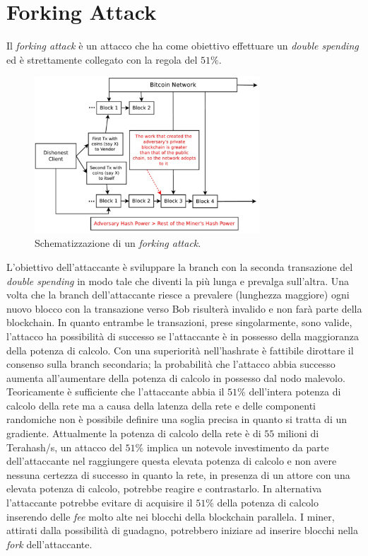 \section{Forking Attack}
Il \textit{forking attack} è un attacco che ha come obiettivo effettuare un \textit{double spending} ed è strettamente collegato con la regola del $51\%$.
\begin{figure}[H]
    \centering
    \includegraphics[width=0.75\textwidth]{images/forkingattack.png}
    \caption{Schematizzazione di un \textit{forking attack}.}
\end{figure}
L'obiettivo dell'attaccante è sviluppare la branch con la seconda transazione del \textit{double spending} in modo tale che diventi la più lunga e prevalga sull'altra. Una volta che la branch dell'attaccante riesce a prevalere (lunghezza maggiore) ogni nuovo blocco con la transazione verso Bob risulterà invalido e non farà parte della blockchain.\newline
In quanto entrambe le transazioni, prese singolarmente, sono valide, l'attacco ha possibilità di successo se l'attaccante è in possesso della maggioranza della potenza di calcolo. Con una superiorità nell'hashrate è fattibile dirottare il consenso sulla branch secondaria; la probabilità che l'attacco abbia successo aumenta all'aumentare della potenza di calcolo in possesso dal nodo malevolo.
Teoricamente è sufficiente che l'attaccante abbia il $51\%$ dell'intera potenza di calcolo della rete ma a causa della latenza della rete e delle componenti randomiche non è possibile definire una soglia precisa in quanto si tratta di un gradiente.\newline
Attualmente la potenza di calcolo della rete è di $55$ milioni di Terahash/s, un attacco del $51\%$ implica un notevole investimento da parte dell'attaccante nel raggiungere questa elevata potenza di calcolo e non avere nessuna certezza di successo in quanto la rete, in presenza di un attore con una elevata potenza di calcolo, potrebbe reagire e contrastarlo. In alternativa l'attaccante potrebbe evitare di acquisire il $51\%$ della potenza di calcolo inserendo delle \textit{fee} molto alte nei blocchi della blockchain parallela. I miner, attirati dalla possibilità di guadagno, potrebbero iniziare ad inserire blocchi nella \textit{fork} dell'attaccante.\newline

